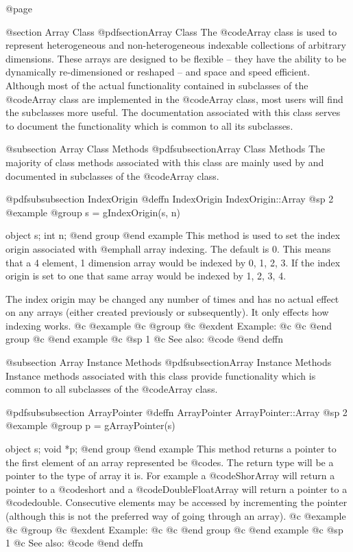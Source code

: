 @page

@section Array Class
@pdfsection{Array Class}
The @code{Array} class is used to represent heterogeneous and
non-heterogeneous indexable collections of arbitrary dimensions.  These
arrays are designed to be flexible -- they have the ability to be
dynamically re-dimensioned or reshaped -- and space and speed efficient.
Although most of the actual functionality contained in subclasses of the
@code{Array} class are implemented in the @code{Array} class, most users
will find the subclasses more useful.  The documentation associated with
this class serves to document the functionality which is common to all
its subclasses.



@subsection Array Class Methods
@pdfsubsection{Array Class Methods}
The majority of class methods associated with this class are mainly used
by and documented in subclasses of the @code{Array} class.





@pdfsubsubsection {IndexOrigin}
@deffn {IndexOrigin} IndexOrigin::Array
@sp 2
@example
@group
s = gIndexOrigin(s, n)

object  s;
int     n;
@end group
@end example
This method is used to set the index origin associated with @emph{all}
array indexing.  The default is 0.  This means that a 4 element, 1
dimension array would be indexed by 0, 1, 2, 3.  If the index origin
is set to one that same array would be indexed by 1, 2, 3, 4.

The index origin may be changed any number of times and has no actual effect
on any arrays (either created previously or subsequently).  It only
effects how indexing works.
@c @example
@c @group
@c @exdent Example:
@c 
@c @end group
@c @end example
@c @sp 1
@c See also:  @code{}
@end deffn






@subsection Array Instance Methods
@pdfsubsection{Array Instance Methods}
Instance methods associated with this class provide functionality which
is common to all subclasses of the @code{Array} class.








@pdfsubsubsection {ArrayPointer}
@deffn {ArrayPointer} ArrayPointer::Array
@sp 2
@example
@group
p = gArrayPointer(s)

object  s;
void    *p;
@end group
@end example
This method returns a pointer to the first element of an array represented
be @code{s}.  The return type will be a pointer to the type of array it
is.  For example a @code{ShorArray} will return a pointer to a @code{short}
and a @code{DoubleFloatArray} will return a pointer to a @code{double}.
Consecutive elements may be accessed by incrementing the pointer (although
this is not the preferred way of going through an array).
@c @example
@c @group
@c @exdent Example:
@c 
@c @end group
@c @end example
@c @sp 1
@c See also:  @code{}
@end deffn










